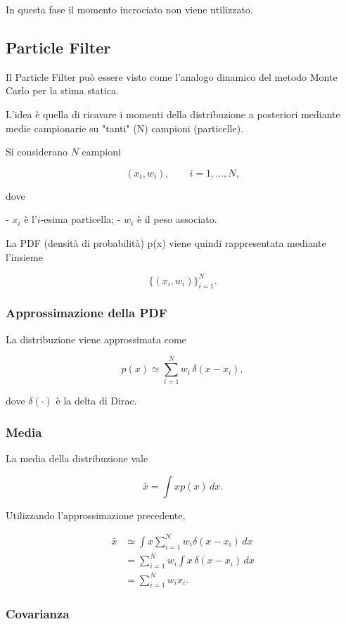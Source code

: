 \documentclass[11pt,a4paper]{article}
\begin{document}
In questa fase il momento incrociato non viene utilizzato.

\subsection*{Particle Filter}

Il Particle Filter può essere visto come l'analogo dinamico del metodo Monte Carlo per la stima statica.

L'idea è quella di ricavare i momenti della distribuzione a posteriori mediante medie campionarie su "tanti" (N) campioni (particelle).

Si considerano \(N\) campioni

\[
(x_i,w_i),
\qquad
i=1,\ldots,N,
\]

dove

- \(x_i\) è l'\(i\)-esima particella;
- \(w_i\) è il peso associato.

La PDF (densità di probabilità) p(x) viene quindi rappresentata mediante l'insieme

\[
\boxed{
\{(x_i,w_i)\}_{i=1}^{N}.
}
\]

\subsubsection*{Approssimazione della PDF}

La distribuzione viene approssimata come

\[
\boxed{
p(x)
\simeq
\sum_{i=1}^{N}
w_i\,\delta(x-x_i),
}
\]

dove \(\delta(\cdot)\) è la delta di Dirac.

\subsubsection*{Media}

La media della distribuzione vale

\[
\bar{x}
=
\int xp(x)\,dx.
\]

Utilizzando l'approssimazione precedente,

\[
\begin{aligned}
\bar{x}
&\simeq
\int
x
\sum_{i=1}^{N}
w_i\delta(x-x_i)\,dx
\\
&=
\sum_{i=1}^{N}
w_i
\int
x\,
\delta(x-x_i)\,dx
\\
&=
\boxed{
\sum_{i=1}^{N}
w_ix_i.
}
\end{aligned}
\]

\subsubsection*{Covarianza}
\end{document}
